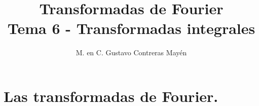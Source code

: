 
\title{Transformadas de Fourier \\ \large {Tema 6 - Transformadas integrales} \vspace{-3ex}}
\author{M. en C. Gustavo Contreras Mayén}
\date{ }

\vspace{-4cm}
\maketitle
\fontsize{14}{14}\selectfont
\tableofcontents
\newpage

\section{Las transformadas de Fourier.}

